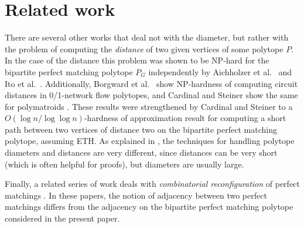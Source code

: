 \section{Related work}
There are several other works that deal not with the diameter, but rather with the problem of computing the \emph{distance} of two given vertices of some polytope $P$.
In the case of the distance this problem was shown to be NP-hard for the bipartite perfect matching polytope $P_G$ independently by Aichholzer et al.\ \cite{DBLP:journals/algorithmica/AichholzerCHKMS21} and Ito et al.\ \cite{DBLP:journals/siamdm/ItoKKKO22}. Additionally, Borgward et al.\ \cite{borgwardt2025hardness} show NP-hardness of computing circuit distances in 0/1-network flow polytopes, and Cardinal and Steiner show the same for polymatroids \cite{cardinal2023shortest}.
These results were strengthened by Cardinal and Steiner \cite{DBLP:conf/ipco/CardinalS23} to a $O(\log n / \log \log n)$-hardness of approximation result for computing a short path between two 
vertices of distance two on the bipartite perfect matching polytope, assuming ETH.
As explained in \cite{nobel2025complexity}, the techniques for handling polytope diameters and distances are very different, since distances can be very short (which is often helpful for proofs), 
but diameters are usually large.

Finally, a related series of work deals with \emph{combinatorial reconfiguration} of perfect matchings \cite{DBLP:journals/tcs/ItoDHPSUU11,kaminski2012complexity,DBLP:conf/sofsem/GuptaKM19,DBLP:conf/wg/BousquetHIM19,bonamy2019perfect, binucci2025flipping}. 
In these papers, the notion of adjacency between two perfect matchings differs from the adjacency on the bipartite perfect matching polytope considered in the present paper.